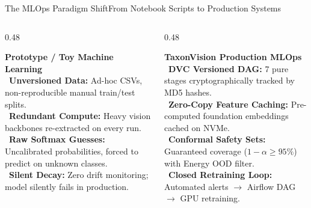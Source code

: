 \documentclass[aspectratio=169,10pt]{beamer}
\begin{document}
\begin{frame}{The MLOps Paradigm Shift}{From Notebook Scripts to Production Systems}
    \begin{columns}[T]
        \begin{column}{0.48\textwidth}
            \begin{rosecard}
                \textbf{\color{RoseAccent} Prototype / Toy Machine Learning}\\[4pt]
                \textbullet\ \textbf{Unversioned Data:} Ad-hoc CSVs, non-reproducible manual train/test splits.\\[4pt]
                \textbullet\ \textbf{Redundant Compute:} Heavy vision backbones re-extracted on every run.\\[4pt]
                \textbullet\ \textbf{Raw Softmax Guesses:} Uncalibrated probabilities, forced to predict on unknown classes.\\[4pt]
                \textbullet\ \textbf{Silent Decay:} Zero drift monitoring; model silently fails in production.
            \end{rosecard}
        \end{column}
        \begin{column}{0.48\textwidth}
            \begin{greencard}
                \textbf{\color{GreenAccent} TaxonVision Production MLOps}\\[4pt]
                \textbullet\ \textbf{DVC Versioned DAG:} 7 pure stages cryptographically tracked by MD5 hashes.\\[4pt]
                \textbullet\ \textbf{Zero-Copy Feature Caching:} Pre-computed foundation embeddings cached on NVMe.\\[4pt]
                \textbullet\ \textbf{Conformal Safety Sets:} Guaranteed coverage ($1-\alpha \ge 95\%$) with Energy OOD filter.\\[4pt]
                \textbullet\ \textbf{Closed Retraining Loop:} Automated alerts $\to$ Airflow DAG $\to$ GPU retraining.
            \end{greencard}
        \end{column}
    \end{columns}
\end{frame}
\end{document}
